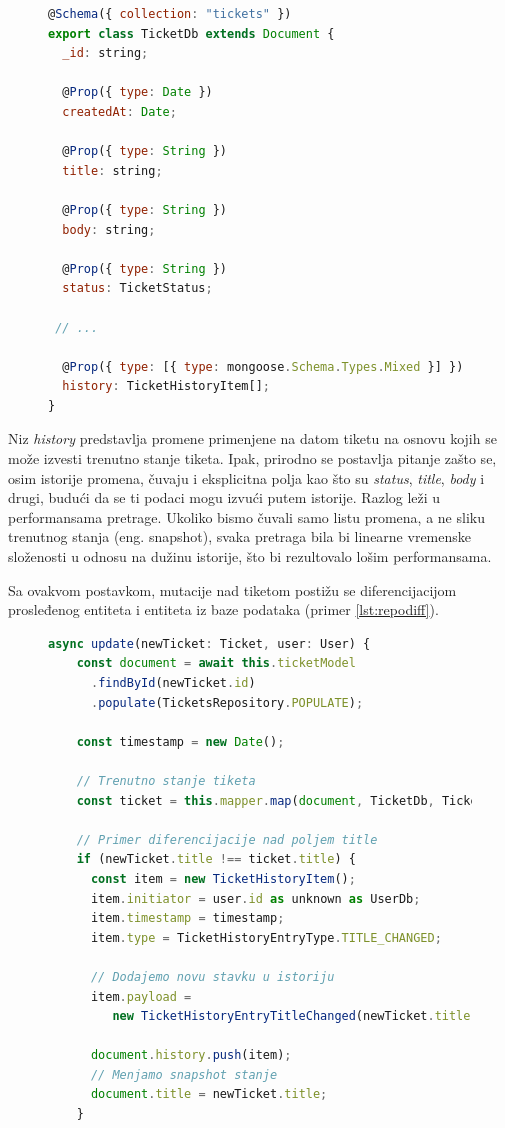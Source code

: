 \documentclass[12pt,oneside]{memoir}
\begin{document}
\begin{figure}[h]
\begin{lstlisting}[language=JavaScript, style=ES6, caption={Definicija sheme tiketa.}, label={lst:ticketschema}]
@Schema({ collection: "tickets" })
export class TicketDb extends Document {
  _id: string;

  @Prop({ type: Date })
  createdAt: Date;

  @Prop({ type: String })
  title: string;

  @Prop({ type: String })
  body: string;

  @Prop({ type: String })
  status: TicketStatus;

 // ...

  @Prop({ type: [{ type: mongoose.Schema.Types.Mixed }] })
  history: TicketHistoryItem[];
}
\end{lstlisting}
\end{figure}


\newpage
Niz \textit{history} predstavlja promene primenjene na datom tiketu na osnovu kojih se može izvesti trenutno stanje tiketa. Ipak, prirodno se postavlja pitanje zašto se, osim istorije promena, čuvaju i eksplicitna polja kao što su \textit{status}, \textit{title}, \textit{body} i drugi, budući da se ti podaci mogu izvući putem istorije. Razlog leži u performansama pretrage. Ukoliko bismo čuvali samo listu promena, a ne sliku trenutnog stanja (eng. snapshot), svaka pretraga bila bi linearne vremenske složenosti u odnosu na dužinu istorije, što bi rezultovalo lošim performansama.

Sa ovakvom postavkom, mutacije nad tiketom postižu se diferencijacijom prosleđenog entiteta i entiteta iz baze podataka (primer \ref{lst:repodiff}).

\begin{figure}[h]
\begin{lstlisting}[language=JavaScript, style=ES6, caption={Fajl \textit{ticket.repository.ts}}, label={lst:repodiff}]
  async update(newTicket: Ticket, user: User) {
    const document = await this.ticketModel
      .findById(newTicket.id)
      .populate(TicketsRepository.POPULATE); 

    const timestamp = new Date();

    // Trenutno stanje tiketa
    const ticket = this.mapper.map(document, TicketDb, Ticket);

    // Primer diferencijacije nad poljem title
    if (newTicket.title !== ticket.title) {
      const item = new TicketHistoryItem();
      item.initiator = user.id as unknown as UserDb;
      item.timestamp = timestamp;
      item.type = TicketHistoryEntryType.TITLE_CHANGED;

      // Dodajemo novu stavku u istoriju
      item.payload = 
         new TicketHistoryEntryTitleChanged(newTicket.title);
         
      document.history.push(item);
      // Menjamo snapshot stanje
      document.title = newTicket.title;
    }
\end{lstlisting}
\end{figure}
\end{document}
